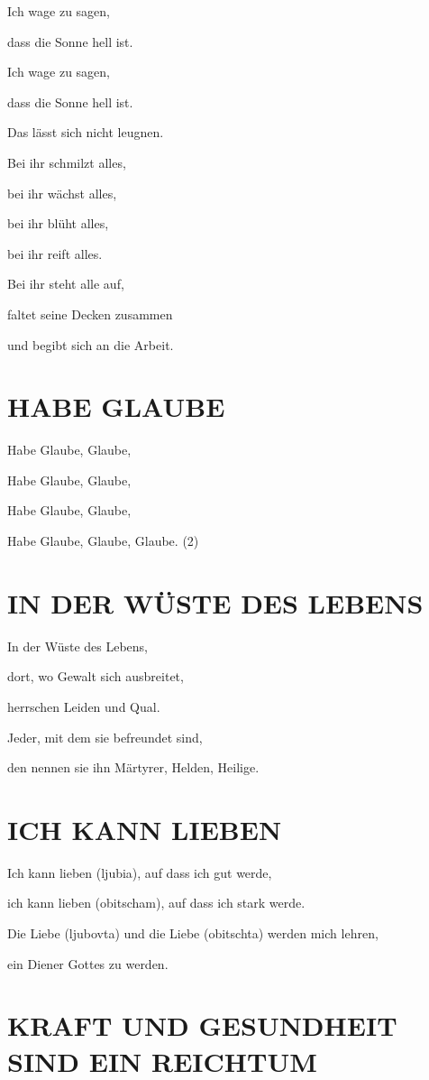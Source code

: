 \documentclass[11pt,a5paper,twoside]{article}
\begin{document}
Ich wage zu sagen, 

dass die Sonne hell ist. 

Ich wage zu sagen, 

dass die Sonne hell ist.

Das lässt sich nicht leugnen.

Bei ihr schmilzt alles, 

bei ihr wächst alles, 

bei ihr blüht alles,

bei ihr reift alles.

Bei ihr steht alle auf, 

faltet seine Decken zusammen

und begibt sich an die Arbeit.  


\section[Habe Glaube]{HABE GLAUBE}

Habe Glaube, Glaube,

Habe Glaube, Glaube,

Habe Glaube, Glaube,

Habe Glaube, Glaube, Glaube. (2)

\section[In der Wüste des Lebens]{IN DER WÜSTE DES LEBENS}

In der Wüste des Lebens,

dort, wo Gewalt sich ausbreitet,

herrschen Leiden und Qual.

Jeder, mit dem sie befreundet sind,

den nennen sie ihn Märtyrer, Helden, Heilige.

\section[Ich kann lieben]{ICH KANN LIEBEN}

Ich kann lieben (ljubia), auf dass ich gut werde, 

ich kann lieben (obitscham), auf dass ich stark werde.


Die Liebe (ljubovta) und die Liebe (obitschta) werden mich lehren, 

ein Diener Gottes zu werden.

\section[Kraft und Gesundheit sind ein Reichtum]{KRAFT UND GESUNDHEIT SIND EIN REICHTUM}
\end{document}
